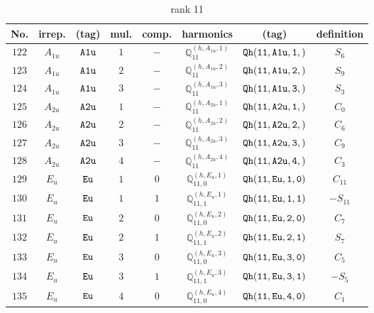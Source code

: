 \documentclass[fleqn,8pt]{jsarticle}
\begin{document}
\begin{table}[ht!]
\begin{center}
\caption{rank 11}
\renewcommand{\arraystretch}{1.3}
\begin{tabular}{cccccccc} \hline \hline
No. & irrep. & (tag) & mul. & comp. & harmonics & (tag) & definition \\ \hline
$ 122 $ & $ A_{1u} $ & $ {\tt A1u} $ & $ 1 $ & $ - $ & $ \mathbb{Q}_{11}^{(h,A_{1u},1)} $ & $ {\tt Qh(11,A1u,1,)} $ & $ S_{6} $ \\
$ 123 $ & $ A_{1u} $ & $ {\tt A1u} $ & $ 2 $ & $ - $ & $ \mathbb{Q}_{11}^{(h,A_{1u},2)} $ & $ {\tt Qh(11,A1u,2,)} $ & $ S_{9} $ \\
$ 124 $ & $ A_{1u} $ & $ {\tt A1u} $ & $ 3 $ & $ - $ & $ \mathbb{Q}_{11}^{(h,A_{1u},3)} $ & $ {\tt Qh(11,A1u,3,)} $ & $ S_{3} $ \\
$ 125 $ & $ A_{2u} $ & $ {\tt A2u} $ & $ 1 $ & $ - $ & $ \mathbb{Q}_{11}^{(h,A_{2u},1)} $ & $ {\tt Qh(11,A2u,1,)} $ & $ C_{0} $ \\
$ 126 $ & $ A_{2u} $ & $ {\tt A2u} $ & $ 2 $ & $ - $ & $ \mathbb{Q}_{11}^{(h,A_{2u},2)} $ & $ {\tt Qh(11,A2u,2,)} $ & $ C_{6} $ \\
$ 127 $ & $ A_{2u} $ & $ {\tt A2u} $ & $ 3 $ & $ - $ & $ \mathbb{Q}_{11}^{(h,A_{2u},3)} $ & $ {\tt Qh(11,A2u,3,)} $ & $ C_{9} $ \\
$ 128 $ & $ A_{2u} $ & $ {\tt A2u} $ & $ 4 $ & $ - $ & $ \mathbb{Q}_{11}^{(h,A_{2u},4)} $ & $ {\tt Qh(11,A2u,4,)} $ & $ C_{3} $ \\
$ 129 $ & $ E_{u} $ & $ {\tt Eu} $ & $ 1 $ & $ 0 $ & $ \mathbb{Q}_{11,0}^{(h,E_{u},1)} $ & $ {\tt Qh(11,Eu,1,0)} $ & $ C_{11} $ \\
$ 130 $ & $ E_{u} $ & $ {\tt Eu} $ & $ 1 $ & $ 1 $ & $ \mathbb{Q}_{11,1}^{(h,E_{u},1)} $ & $ {\tt Qh(11,Eu,1,1)} $ & $ - S_{11} $ \\
$ 131 $ & $ E_{u} $ & $ {\tt Eu} $ & $ 2 $ & $ 0 $ & $ \mathbb{Q}_{11,0}^{(h,E_{u},2)} $ & $ {\tt Qh(11,Eu,2,0)} $ & $ C_{7} $ \\
$ 132 $ & $ E_{u} $ & $ {\tt Eu} $ & $ 2 $ & $ 1 $ & $ \mathbb{Q}_{11,1}^{(h,E_{u},2)} $ & $ {\tt Qh(11,Eu,2,1)} $ & $ S_{7} $ \\
$ 133 $ & $ E_{u} $ & $ {\tt Eu} $ & $ 3 $ & $ 0 $ & $ \mathbb{Q}_{11,0}^{(h,E_{u},3)} $ & $ {\tt Qh(11,Eu,3,0)} $ & $ C_{5} $ \\
$ 134 $ & $ E_{u} $ & $ {\tt Eu} $ & $ 3 $ & $ 1 $ & $ \mathbb{Q}_{11,1}^{(h,E_{u},3)} $ & $ {\tt Qh(11,Eu,3,1)} $ & $ - S_{5} $ \\
$ 135 $ & $ E_{u} $ & $ {\tt Eu} $ & $ 4 $ & $ 0 $ & $ \mathbb{Q}_{11,0}^{(h,E_{u},4)} $ & $ {\tt Qh(11,Eu,4,0)} $ & $ C_{1} $ \\

\end{tabular}
\end{center}
\end{table}
\end{document}
